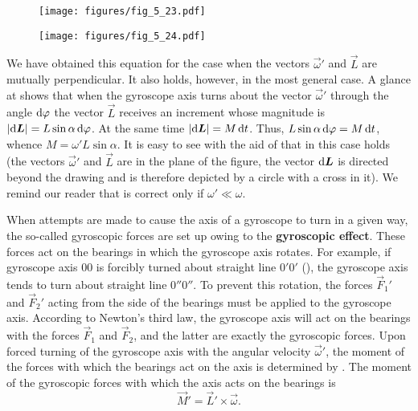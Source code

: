 \begin{figure}[t]
	\begin{minipage}[t]{0.55\linewidth}
		\begin{center}
			\texttt{[image: figures/fig\_5\_23.pdf]}
			\caption[]{}
			\label{fig:5_23}
		\end{center}
	\end{minipage}
	\hspace{-0.05cm}
	\begin{minipage}[t]{0.45\linewidth}
		\begin{center}
			\texttt{[image: figures/fig\_5\_24.pdf]}
			\caption[]{}
			\label{fig:5_24}
		\end{center}
	\end{minipage}
	\vspace{-0.65cm}
\end{figure}

\noindent
We have obtained this equation for the case when the vectors $\vec{\omega}'$ and $\vec{L}$ are mutually perpendicular. It also holds, however, in the most general case. A glance at  shows that when the gyroscope axis turns about the vector $\vec{\omega}'$ through the angle $\mathrm{d}\varphi$ the vector $\vec{L}$ receives an increment whose magnitude is $|\mathrm{d}\boldsymbol{L}|=L\sin\alpha\,\mathrm{d}\varphi$. At the same time $|\mathrm{d}\boldsymbol{L}|=M\,\mathrm{d} t$. Thus, $L\sin\alpha\,\mathrm{d}\varphi=M\,\mathrm{d} t$, whence $M=\omega'L\sin\alpha$. It is easy to see with the aid of  that in this case  holds (the vectors $\vec{\omega}'$ and $\vec{L}$ are in the plane of the figure, the vector $\mathrm{d}\boldsymbol{L}$ is directed beyond the drawing and is therefore depicted by a circle with a cross in it). We remind our reader that  is correct only if $\omega'\ll\omega$.

When attempts are made to cause the axis of a gyroscope to turn in a given way, the so-called gyroscopic forces are set up owing to the \textbf{gyroscopic effect}. These forces act on the bearings in which the gyroscope axis rotates. For example, if gyroscope axis $00$ is forcibly turned about straight line $0'0'$ (), the gyroscope axis tends to turn about straight line $0''0''$. To prevent this rotation, the forces $\vec{F}_1'$ and $\vec{F}_2'$ acting from the side of the bearings must be applied to the gyroscope axis. According to Newton's third law, the gyroscope axis will act on the bearings with the forces $\vec{F}_1$ and $\vec{F}_2$, and the latter are exactly the gyroscopic forces. Upon forced turning of the gyroscope axis with the angular velocity $\vec{\omega}'$, the moment of the forces with which the bearings act on the axis is determined by . The moment of the gyroscopic forces with which the axis acts on the bearings is
\begin{equation}\label{eq:5_70}
	\vec{M}' = \vec{L}' \times \vec{\omega}.
\end{equation}


